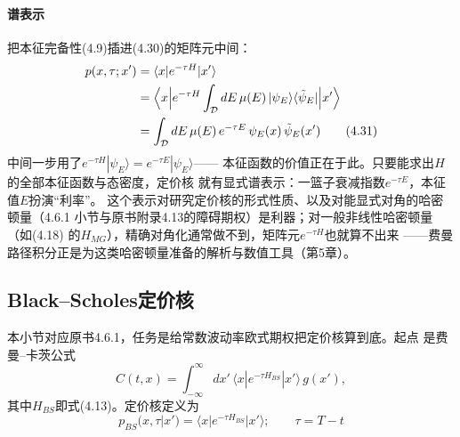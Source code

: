 \paragraph{谱表示}
把本征完备性(4.9)插进(4.30)的矩阵元中间：
\begin{align*}
p(x,\tau;x')
&=\langle x|e^{-\tau H}|x'\rangle\\
&=\Bigl\langle x\Bigl|e^{-\tau H}
\int_{\mathcal{D}}dE\,\mu(E)\,|\psi_{E}\rangle\langle\tilde{\psi}_{E}|
\Bigr|x'\Bigr\rangle\\
&=\int_{\mathcal{D}}dE\,\mu(E)\,e^{-\tau E}\,
\psi_{E}(x)\,\tilde{\psi}_{E}(x')
\tag{4.31}
\end{align*}
中间一步用了$e^{-\tau H}|\psi_{E}\rangle=e^{-\tau E}|\psi_{E}\rangle$——
本征函数的价值正在于此。只要能求出$H$的全部本征函数与态密度，定价核
就有显式谱表示：一篮子衰减指数$e^{-\tau E}$，本征值$E$扮演“利率”。
这个表示对研究定价核的形式性质、以及对能显式对角的哈密顿量（4.6.1
小节与原书附录4.13的障碍期权）是利器；对一般非线性哈密顿量（如(4.18)
的$H_{MG}$），精确对角化通常做不到，矩阵元$e^{-\tau H}$也就算不出来
——费曼路径积分正是为这类哈密顿量准备的解析与数值工具（第5章）。

\subsection{Black--Scholes定价核}

本小节对应原书4.6.1，任务是给常数波动率欧式期权把定价核算到底。起点
是费曼--卡茨公式
\begin{equation*}
C(t,x)=\int_{-\infty}^{\infty}dx'\,
\langle x|e^{-\tau H_{BS}}|x'\rangle\,g(x'),
\end{equation*}
其中$H_{BS}$即式(4.13)。定价核定义为
\begin{equation*}
p_{BS}(x,\tau|x')=\langle x|e^{-\tau H_{BS}}|x'\rangle
;\qquad \tau=T-t
\tag{4.32}
\end{equation*}

